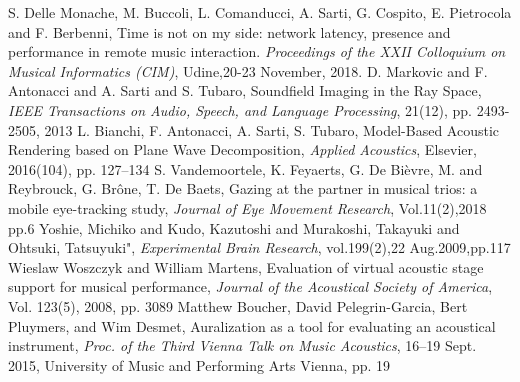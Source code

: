 S. Delle Monache, M. Buccoli, L. Comanducci, A. Sarti, G. Cospito, E. Pietrocola and F. Berbenni, Time is not on my side: network latency, presence and performance in remote music interaction. \emph{Proceedings of the XXII Colloquium on Musical Informatics (CIM)}, Udine,20-23 November, 2018.
%
D. Markovic and F. Antonacci and A. Sarti and S. Tubaro, Soundfield Imaging in the Ray Space,
\emph{IEEE Transactions on Audio, Speech, and Language Processing}, 
21(12), 
pp. 2493-2505, 2013
%
L. Bianchi, F. Antonacci, A. Sarti, S. Tubaro,
Model-Based Acoustic Rendering based on Plane Wave Decomposition,
\emph{Applied Acoustics},
Elsevier,
2016(104),
pp. 127--134
S. Vandemoortele, K. Feyaerts, G. De Bi{\`e}vre, M. and Reybrouck, G. Br{\^o}ne, T. De Baets,
Gazing at the partner in musical trios: a mobile eye-tracking study,
\emph{Journal of Eye Movement Research}, 
Vol.11(2),2018
pp.6
Yoshie, Michiko
and Kudo, Kazutoshi
and Murakoshi, Takayuki
and Ohtsuki, Tatsuyuki",
\emph{Experimental Brain Research},
vol.199(2),22 Aug.2009,pp.117
%
Wieslaw Woszczyk and William Martens, Evaluation of virtual acoustic stage support for musical performance, \emph{Journal of the Acoustical Society of America}, Vol. 123(5), 2008, pp. 3089
%
Matthew Boucher, David Pelegrin-Garcia, Bert Pluymers, and Wim Desmet, Auralization as a tool for evaluating an acoustical instrument, \emph{Proc. of the Third Vienna Talk on Music Acoustics}, 16–19 Sept. 2015, University of Music and Performing Arts Vienna, pp. 19
%	
%	
%	
%	
%	
%	
%	